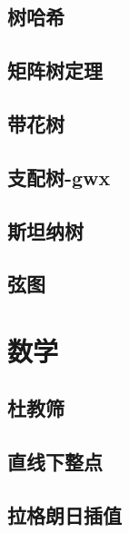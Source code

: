 \documentclass[titlepage,a4paper,10pt]{article}
\begin{document}
\begin{multicols}{2}
\begin{spacing}{0.8}
			\subsection{树哈希}
				
			\subsection{矩阵树定理}
				
			\subsection{带花树}
				
			\subsection{支配树-gwx}
				
			\subsection{斯坦纳树}
				
			\subsection{弦图}
				
		\section{数学}
			\subsection{杜教筛}
				
			\subsection{直线下整点}
				
			\subsection{拉格朗日插值}
				

\end{spacing}
\end{multicols}
\end{document}

